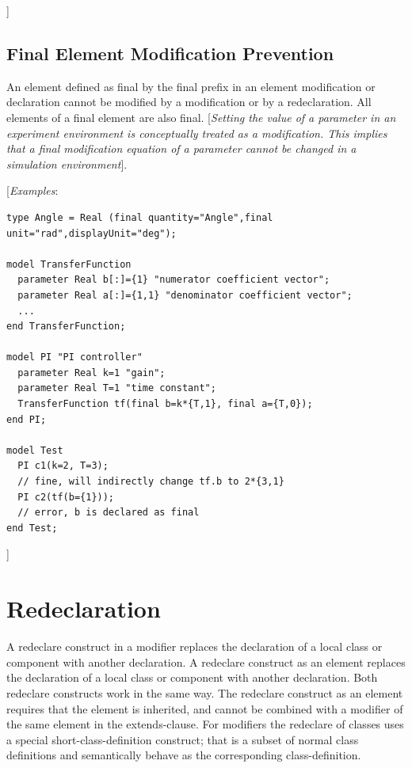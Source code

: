 \documentclass[10pt,a4paper]{report}
\def\doublelabel#1{\label{#1}\hypertarget{#1}{}}
\begin{document}
{]}

\subsection{Final Element Modification Prevention}\doublelabel{final-element-modification-prevention}

An element defined as final by the final prefix in an element
modification or declaration cannot be modified by a modification or by a
redeclaration. All elements of a final element are also final.
{[}\emph{Setting the value of a parameter in an experiment environment
is conceptually treated as a modification. This implies that a final
modification equation of a parameter cannot be changed in a simulation
environment}{]}.

{[}\emph{Examples}:
\begin{lstlisting}[language=modelica]
type Angle = Real (final quantity="Angle",final unit="rad",displayUnit="deg");

model TransferFunction
  parameter Real b[:]={1} "numerator coefficient vector";
  parameter Real a[:]={1,1} "denominator coefficient vector";
  ...
end TransferFunction;

model PI "PI controller"
  parameter Real k=1 "gain";
  parameter Real T=1 "time constant";
  TransferFunction tf(final b=k*{T,1}, final a={T,0});
end PI;

model Test
  PI c1(k=2, T=3);
  // fine, will indirectly change tf.b to 2*{3,1}
  PI c2(tf(b={1}));
  // error, b is declared as final
end Test;
\end{lstlisting}
{]}

\section{Redeclaration}\doublelabel{redeclaration}

A redeclare construct in a modifier replaces the declaration of a local
class or component with another declaration. A redeclare construct as an
element replaces the declaration of a local class or component with
another declaration. Both redeclare constructs work in the same way. The
redeclare construct as an element requires that the element is
inherited, and cannot be combined with a modifier of the same element in
the extends-clause. For modifiers the redeclare of classes uses a
special short-class-definition construct; that is a subset of normal
class definitions and semantically behave as the corresponding
class-definition.
\end{document}
